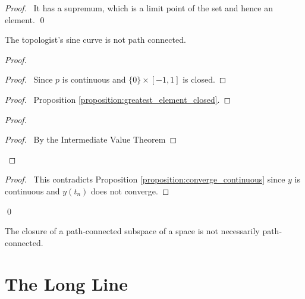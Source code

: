 \begin{proof}
    \pf\ It has a supremum, which is a limit point of the set and hence an element. \qed
\end{proof}

\begin{proposition}[CC]
    The topologist's sine curve is not path connected.
\end{proposition}

\begin{proof}
    \pf
    \begin{proof}
        \pf\ Since $p$ is continuous and $\{0\} \times [-1,1]$ is closed.
    \end{proof}
    \begin{proof}
        \pf\ Proposition \ref{proposition:greatest_element_closed}.
    \end{proof}
    \step{5}{\pick\ a sequence $t_n$ in $(b,1]$ such that $t_n \rightarrow b$ and $y(t_n) = (-1)^n$ for all $n$}
    \begin{proof}
        \begin{proof}
            \pf\ By the Intermediate Value Theorem
        \end{proof}
    \end{proof}
    \qedstep
    \begin{proof}
        \pf\ This contradicts Proposition \ref{proposition:converge_continuous} since $y$ is continuous and $y(t_n)$ does not converge.
    \end{proof}
    \qed
\end{proof}

\begin{corollary}
    The closure of a path-connected subspace of a space is not necessarily path-connected.
\end{corollary}

\section{The Long Line}

